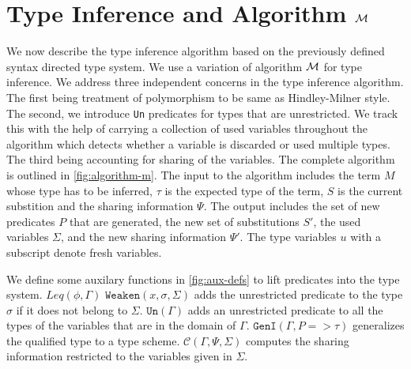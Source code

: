 \section{Type Inference and Algorithm $\mathcal{M}$}\label{sec:algorithm-m}
We now describe the type inference algorithm based on the previously defined syntax directed
type system. We use a variation of algorithm $\mathcal{M}$ \citep{lee_proofs_1998} for type inference.
We address three independent concerns in the type inference algorithm.
The first being treatment of polymorphism to be same as Hindley-Milner style. The second, we introduce
\texttt{Un} predicates for types that are unrestricted. We track this with the help of carrying a
collection of used variables throughout the algorithm which detects whether a variable is discarded
or used multiple types. The third being accounting for sharing of the variables.
The complete algorithm is outlined in \cref{fig:algorithm-m}. The input to the algorithm includes the term $M$ whose
type has to be inferred, $\tau$ is the expected type of the term, $S$ is the current substition and the
sharing information $\Psi$. The output includes the set of new predicates $P$ that are generated,
the new set of substitutions $S'$, the used variables $\Sigma$, and the new sharing information $\Psi'$.
The type variables $u$ with a subscript denote fresh variables.

We define some auxilary functions in \cref{fig:aux-defs} to lift predicates into the type system.
$Leq(\phi, \Gamma)$
$\texttt{Weaken}(x, \sigma, \Sigma)$ adds the unrestricted predicate to the type $\sigma$
if it does not belong to $\Sigma$. $\texttt{Un}(\Gamma)$ adds an unrestricted
predicate to all the types of the variables that are in the domain of $\Gamma$.
$\texttt{GenI}(\Gamma, P => \tau)$ generalizes the qualified type to a type scheme.
$\mathcal{C}(\Gamma, \Psi, \Sigma)$ computes the sharing information
restricted to the variables given in $\Sigma$.

